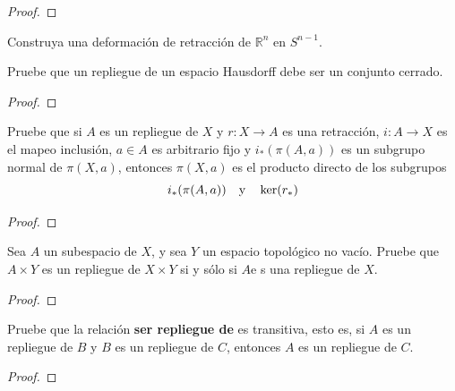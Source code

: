\documentclass[12pt]{report}
\theoremstyle{largebreak}
\newcommand\cf[3]{\ensuremath{#1:#2\rightarrow#3}}
\begin{document}
    \begin{proof}
        
    \end{proof}

    \begin{excer}
        Construya una deformación de retracción de $\mathbb{R}^n$ en $S^{ n-1}$.
    \end{excer}

    \begin{sol}
        
    \end{sol}

    \begin{excer}
        Pruebe que un repliegue de un espacio Hausdorff debe ser un conjunto cerrado.
    \end{excer}

    \begin{proof}
        
    \end{proof}

    \begin{excer}
        Pruebe que si $A$ es un repliegue de $X$ y $\cf{r}{X}{A}$ es una retracción, $\cf{i}{A}{X}$ es el mapeo inclusión, $a\in A$ es arbitrario fijo y $i_*(\pi(A,a))$ es un subgrupo normal de $\pi(X,a)$, entonces $\pi(X,a)$ es el producto directo de los subgrupos
        \begin{equation*}
            i_*(\pi(A,a))\quad\textup{y}\quad \ker(r_*)
        \end{equation*}
    \end{excer}

    \begin{proof}
        
    \end{proof}

    \begin{excer}
        Sea $A$ un subespacio de $X$, y sea $Y$ un espacio topológico no vacío. Pruebe que $A\times Y$ es un repliegue de $X\times Y$ si y sólo si $A$e s una repliegue de $X$.
    \end{excer}

    \begin{proof}
        
    \end{proof}

    \begin{excer}
        Pruebe que la relación \textbf{ser repliegue de} es transitiva, esto es, si $A$ es un repliegue de $B$ y $B$ es un repliegue de $C$, entonces $A$ es un repliegue de $C$.
    \end{excer}

    \begin{proof}
        
    \end{proof}
\end{document}
